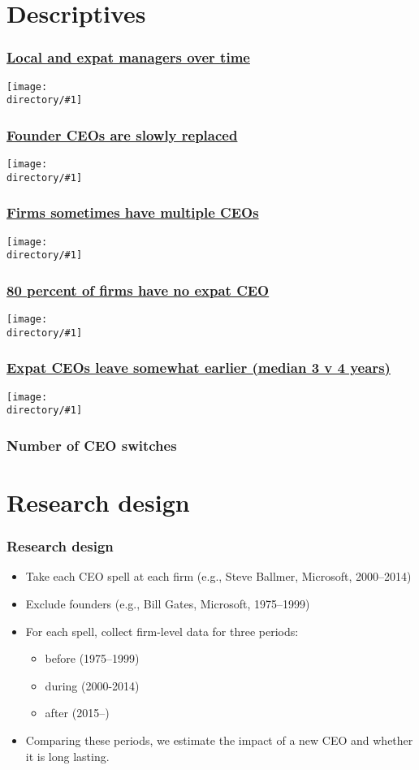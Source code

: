 \documentclass[aspectratio=169,compress,mathserif]{beamer}
\newcounter{perc}
\newcommand{\directory}{output/figure}
\newcommand{\widefigure}[2]{\begin{frame}\frametitle{\hyperlink{#1back}{#2}}\hypertarget{#1}{{\begin{center}\texttt{[image: \\directory/\#1]}\end{center}}}\end{frame}}
\newcommand{\longfigure}[2]{\begin{frame}\frametitle{\hyperlink{#1back}{#2}}\hypertarget{#1}{{\begin{center}\texttt{[image: \\directory/\#1]}\end{center}}}\end{frame}}
\begin{document}
\section{Descriptives}\hypertarget{Descriptives}{}
\longfigure{shares_over_time}{Local and expat managers over time}
\longfigure{CEO_type_by_age}{Founder CEOs are slowly replaced}
\longfigure{CEO_N_histogram}{Firms sometimes have multiple CEOs}
\widefigure{CEO_N_histogram_by}{80 percent of firms have no expat CEO}
\widefigure{CEO_tenure_histogram}{Expat CEOs leave somewhat earlier (median 3 v 4 years)}


\begin{frame}\frametitle{Number of CEO switches}\hypertarget{Number of CEO switches}{}





\end{frame}







\section{Research design}\hypertarget{Research design}{}
\begin{frame}\frametitle{Research design}\hypertarget{Research design}{}
\begin{itemize}
\item Take each CEO spell at each firm (e.g., Steve Ballmer, Microsoft, 2000--2014)

\item Exclude founders (e.g., Bill Gates, Microsoft, 1975--1999)

\item For each spell, collect firm-level data for three periods:
\begin{itemize}
\item before (1975--1999)

\item during (2000-2014)

\item after (2015--)
\end{itemize}

\item Comparing these periods, we estimate the impact of a new CEO and whether it is long lasting.


\end{itemize}
\end{frame}
\end{document}
